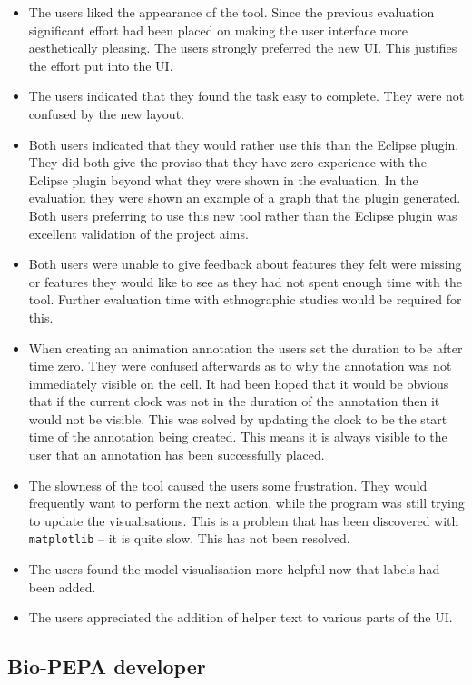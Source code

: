 \begin{itemize}
\item The users liked the appearance of the tool.  Since the previous evaluation significant effort had been placed on making the user interface more aesthetically pleasing.  The users strongly preferred the new \ac{UI}.  This justifies the effort put into the \ac{UI}.
\item The users indicated that they found the task easy to complete.  They were not confused by the new layout.
\item Both users indicated that they would rather use this than the Eclipse plugin.  They did both give the proviso that they have zero experience with the Eclipse plugin beyond what they were shown in the evaluation.  In the evaluation they were shown an example of a graph that the plugin generated.  Both users preferring to use this new tool rather than the Eclipse plugin was excellent validation of the project aims.
\item Both users were unable to give feedback about features they felt were missing or features they would like to see as they had not spent enough time with the tool.  Further evaluation time with ethnographic studies would be required for this.
\item When creating an animation annotation the users set the duration to be after time zero.  They were confused afterwards as to why the annotation was not immediately visible on the cell.  It had been hoped that it would be obvious that if the current clock was not in the duration of the annotation then it would not be visible.  This was solved by updating the clock to be the start time of the annotation being created. This means it is always visible to the user that an annotation has been successfully placed.
\item The slowness of the tool caused the users some frustration.  They would frequently want to perform the next action, while the program was still trying to update the visualisations.  This is a problem that has been discovered with \texttt{matplotlib} -- it is quite slow.  This has not been resolved.
\item The users found the model visualisation more helpful now that labels had been added.
\item The users appreciated the addition of helper text to various parts of the \ac{UI}.
\end{itemize}

\subsection{Bio-PEPA developer}

